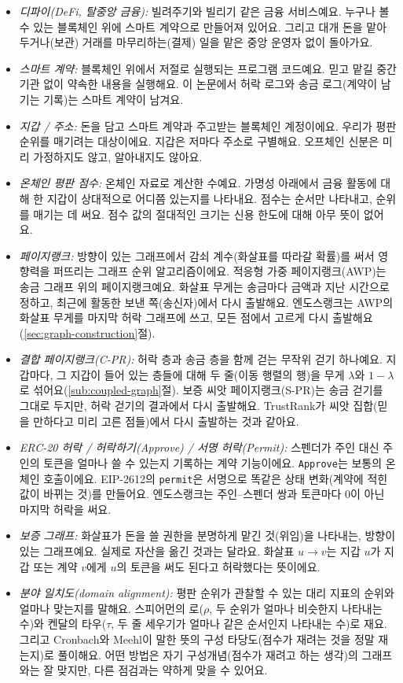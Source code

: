 \begin{itemize}
\item \emph{디파이(DeFi, 탈중앙 금융):} 빌려주기와 빌리기 같은 금융 서비스예요. 누구나 볼 수 있는 블록체인 위에 스마트 계약으로 만들어져 있어요. 그리고 대개 돈을 맡아 두거나(보관) 거래를 마무리하는(결제) 일을 맡은 중앙 운영자 없이 돌아가요.
\item \emph{스마트 계약:} 블록체인 위에서 저절로 실행되는 프로그램 코드예요. 믿고 맡길 중간 기관 없이 약속한 내용을 실행해요. 이 논문에서 허락 로그와 송금 로그(계약이 남기는 기록)는 스마트 계약이 남겨요.
\item \emph{지갑 / 주소:} 돈을 담고 스마트 계약과 주고받는 블록체인 계정이에요. 우리가 평판 순위를 매기려는 대상이에요. 지갑은 저마다 주소로 구별해요. 오프체인 신분은 미리 가정하지도 않고, 알아내지도 않아요.
\item \emph{온체인 평판 점수:} 온체인 자료로 계산한 수예요. 가명성 아래에서 금융 활동에 대해 한 지갑이 상대적으로 어디쯤 있는지를 나타내요. 점수는 순서만 나타내고, 순위를 매기는 데 써요. 점수 값의 절대적인 크기는 신용 한도에 대해 아무 뜻이 없어요.
\item \emph{페이지랭크:} 방향이 있는 그래프에서 감쇠 계수(화살표를 따라갈 확률)를 써서 영향력을 퍼뜨리는 그래프 순위 알고리즘이에요. 적응형 가중 페이지랭크(AWP)는 송금 그래프 위의 페이지랭크예요. 화살표 무게는 송금마다 금액과 지난 시간으로 정하고, 최근에 활동한 보낸 쪽(송신자)에서 다시 출발해요. 엔도스랭크는 AWP의 화살표 무게를 마지막 허락 그래프에 쓰고, 모든 점에서 고르게 다시 출발해요(\ref{sec:graph-construction}절).
\item \emph{결합 페이지랭크(C-PR):} 허락 층과 송금 층을 함께 걷는 무작위 걷기 하나예요. 지갑마다, 그 지갑이 들어 있는 층들에 대해 두 줄(이동 행렬의 행)을 무게 $\lambda$와 $1-\lambda$로 섞어요(\ref{sub:coupled-graph}절). 보증 씨앗 페이지랭크(S-PR)는 송금 걷기를 그대로 두지만, 허락 걷기의 결과에서 다시 출발해요. TrustRank가 씨앗 집합(믿을 만하다고 미리 고른 점들)에서 다시 출발하는 것과 같아요.
\item \emph{ERC-20 허락 / 허락하기(Approve) / 서명 허락(Permit):} 스펜더가 주인 대신 주인의 토큰을 얼마나 쓸 수 있는지 기록하는 계약 기능이에요. \texttt{Approve}는 보통의 온체인 호출이에요. EIP-2612의 \texttt{permit}은 서명으로 똑같은 상태 변화(계약에 적힌 값이 바뀌는 것)를 만들어요. 엔도스랭크는 주인--스펜더 쌍과 토큰마다 0이 아닌 마지막 허락을 써요.
\item \emph{보증 그래프:} 화살표가 돈을 쓸 권한을 분명하게 맡긴 것(위임)을 나타내는, 방향이 있는 그래프예요. 실제로 자산을 옮긴 것과는 달라요. 화살표 $u \to v$는 지갑 $u$가 지갑 또는 계약 $v$에게 $u$의 토큰을 써도 된다고 허락했다는 뜻이에요.
\item \emph{분야 일치도(domain alignment):} 평판 순위가 관찰할 수 있는 대리 지표의 순위와 얼마나 맞는지를 말해요. 스피어먼의 로($\rho$, 두 순위가 얼마나 비슷한지 나타내는 수)와 켄달의 타우($\tau$, 두 줄 세우기가 얼마나 같은 순서인지 나타내는 수)로 재요. 그리고 Cronbach와 Meehl이 말한 뜻의 구성 타당도(점수가 재려는 것을 정말 재는지)로 풀이해요. 어떤 방법은 자기 구성개념(점수가 재려고 하는 생각)의 그래프와는 잘 맞지만, 다른 점검과는 약하게 맞을 수 있어요.
\end{itemize}

